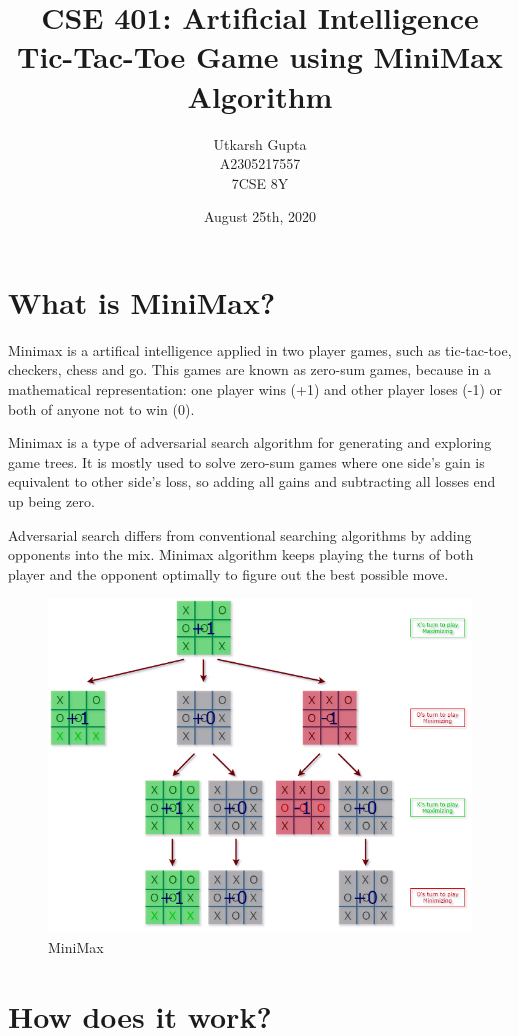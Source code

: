 \documentclass[11pt]{article}
\title{%
    CSE 401: Artificial Intelligence \\
    \Large Tic-Tac-Toe Game using MiniMax Algorithm}
\author{%
      Utkarsh Gupta \\
      \small A2305217557 \\
      \small 7CSE 8Y}
\date{August 25th, 2020}
\begin{document}
    
    \maketitle
    
    \hypertarget{introduction}{%
\section{What is MiniMax?}\label{introduction}}

Minimax is a artifical intelligence applied in two player games, such as
tic-tac-toe, checkers, chess and go. This games are known as zero-sum
games, because in a mathematical representation: one player wins (+1)
and other player loses (-1) or both of anyone not to win (0).

Minimax is a type of adversarial search algorithm for generating and
exploring game trees. It is mostly used to solve zero-sum games where
one side's gain is equivalent to other side's loss, so adding all gains
and subtracting all losses end up being zero.

Adversarial search differs from conventional searching algorithms by
adding opponents into the mix. Minimax algorithm keeps playing the turns
of both player and the opponent optimally to figure out the best
possible move.

\begin{figure}
\centering
\includegraphics[width=13cm]{assets/minimax.png}
\caption{MiniMax}
\end{figure}

    \hypertarget{how-does-it-work}{%
\section{How does it work?}\label{how-does-it-work}}
\end{document}
